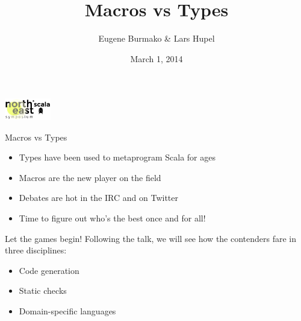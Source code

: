 \documentclass{beamer}
\begin{document}
  \title{Macros vs Types}
  \author{Eugene Burmako \& Lars Hupel}
  \date{March 1, 2014}

{
\begin{frame}
  \titlepage

  \begin{center}
    \includegraphics[width=2cm]{img/nescala-logo.png}
  \end{center}
\end{frame}
}

\begin{frame}{Macros vs Types}
  \begin{itemize}
    \item Types have been used to metaprogram Scala for ages
    \item Macros are the new player on the field
    \item Debates are hot in the IRC and on Twitter
    \item Time to figure out who's the best once and for all!
  \end{itemize}
\end{frame}

\begin{frame}{Let the games begin!}
  Following the  talk, we will see how the contenders fare in three disciplines:

  \vspace{1em}
  \begin{itemize}
    \item Code generation
    \item Static checks
    \item Domain-specific languages
  \end{itemize}
\end{frame}

\end{document}

